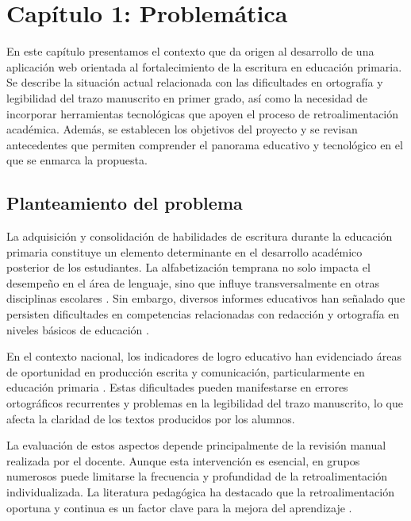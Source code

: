 \newpage
\section{Capítulo 1: Problemática}

En este capítulo presentamos el contexto que da origen al desarrollo de una aplicación web orientada
al fortalecimiento de la escritura en educación primaria. Se describe la situación actual relacionada
con las dificultades en ortografía y legibilidad del trazo manuscrito en primer grado, así como la
necesidad de incorporar herramientas tecnológicas que apoyen el proceso de retroalimentación
académica. Además, se establecen los objetivos del proyecto y se revisan antecedentes que permiten
comprender el panorama educativo y tecnológico en el que se enmarca la propuesta.

\subsection{Planteamiento del problema}

La adquisición y consolidación de habilidades de escritura durante la educación primaria constituye
un elemento determinante en el desarrollo académico posterior de los estudiantes. La alfabetización
temprana no solo impacta el desempeño en el área de lenguaje, sino que influye transversalmente en
otras disciplinas escolares \cite{unesco2022tech}. Sin embargo, diversos informes educativos han señalado que persisten
dificultades en competencias relacionadas con redacción y ortografía en niveles básicos de educación
\cite{mejoredu2022indicadores}.

En el contexto nacional, los indicadores de logro educativo han evidenciado áreas de oportunidad en
producción escrita y comunicación, particularmente en educación primaria \cite{worldbank2023reimagining}. Estas dificultades
pueden manifestarse en errores ortográficos recurrentes y problemas en la legibilidad del trazo
manuscrito, lo que afecta la claridad de los textos producidos por los alumnos.

La evaluación de estos aspectos depende principalmente de la revisión manual realizada por el docente. Aunque esta intervención es esencial, en grupos numerosos puede limitarse la frecuencia y profundidad de la retroalimentación individualizada. La literatura pedagógica ha destacado que la retroalimentación oportuna y continua es un factor clave para la mejora del aprendizaje \cite{berninger2010teaching}.


